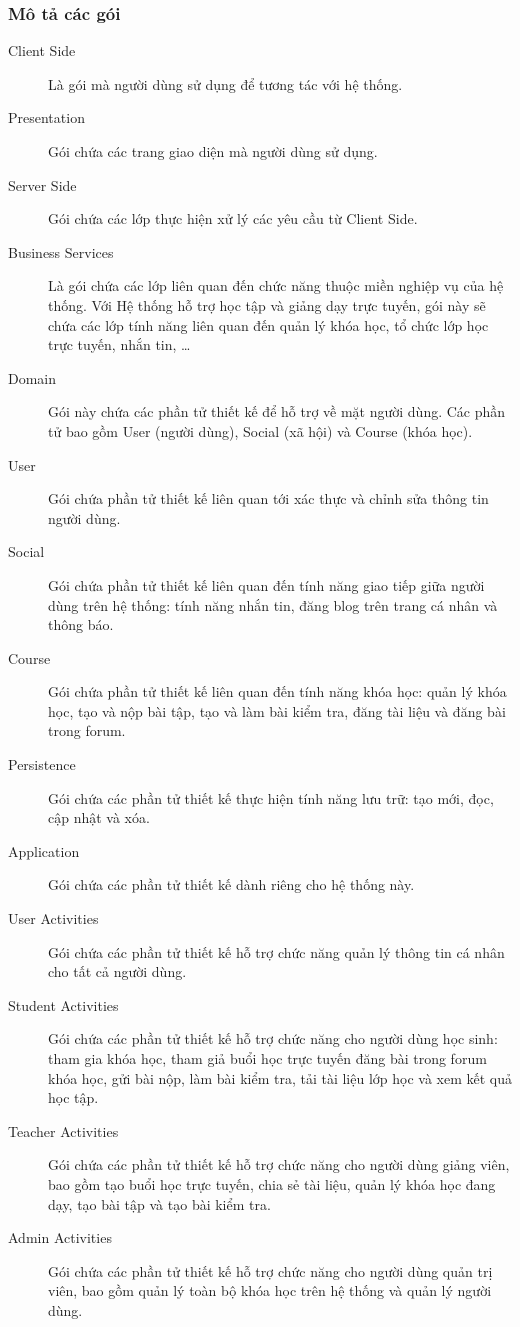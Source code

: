 \documentclass[./../main.tex]{subfiles}
\begin{document}
\subsubsection{Mô tả các gói}
\begin{description}
	\item[Client Side] Là gói mà người dùng sử dụng để tương tác với hệ thống.
	\item[Presentation] Gói chứa các trang giao diện mà người dùng sử dụng.
	\item[Server Side] Gói chứa các lớp thực hiện xử lý các yêu cầu từ Client Side.
	\item[Business Services] Là gói chứa các lớp liên quan đến chức năng thuộc miền nghiệp vụ của hệ thống. Với Hệ thống hỗ trợ học tập và giảng dạy trực tuyến, gói này sẽ chứa các lớp tính năng liên quan đến quản lý khóa học, tổ chức lớp học trực tuyến, nhắn tin, …
	\item[Domain] Gói này chứa các phần tử thiết kế để hỗ trợ về mặt người dùng. Các phần tử bao gồm User (người dùng), Social (xã hội) và Course (khóa học).
	\item[User] Gói chứa phần tử thiết kế liên quan tới xác thực và chỉnh sửa thông tin người dùng.
	\item[Social] Gói chứa phần tử thiết kế liên quan đến tính năng giao tiếp giữa người dùng trên hệ thống: tính năng nhắn tin, đăng blog trên trang cá nhân và thông báo.
	\item[Course] Gói chứa phần tử thiết kế liên quan đến tính năng khóa học: quản lý khóa học, tạo và nộp bài tập, tạo và làm bài kiểm tra, đăng tài liệu và đăng bài trong forum.
	\item[Persistence] Gói chứa các phần tử thiết kế thực hiện tính năng lưu trữ: tạo mới, đọc, cập nhật và xóa.
	\item[Application] Gói chứa các phần tử thiết kế dành riêng cho hệ thống này.
	\item[User Activities] Gói chứa các phần tử thiết kế hỗ trợ chức năng quản lý thông tin cá nhân cho tất cả người dùng.
	\item[Student Activities] Gói chứa các phần tử thiết kế hỗ trợ chức năng cho người dùng học sinh: tham gia khóa học, tham giả buổi học trực tuyến đăng bài trong forum khóa học, gửi bài nộp, làm bài kiểm tra, tải tài liệu lớp học và xem kết quả học tập.
	\item[Teacher Activities] Gói chứa các phần tử thiết kế hỗ trợ chức năng cho người dùng giảng viên, bao gồm tạo buổi học trực tuyến, chia sẻ tài liệu, quản lý khóa học đang dạy, tạo bài tập và tạo bài kiểm tra.
	\item[Admin Activities] Gói chứa các phần tử thiết kế hỗ trợ chức năng cho người dùng quản trị viên, bao gồm quản lý toàn bộ khóa học trên hệ thống và quản lý người dùng.
\end{description}
\end{document}
